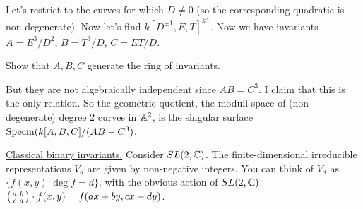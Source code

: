 Let's restrict to the curves for which $D\neq 0$ (so the corresponding quadratic is non-degenerate). Now let's find $k[D^{\pm 1},E,T]^{k^\times}$. Now we have invariants $A=E^3/D^2$, $B=T^3/D$, $C=ET/D$.
\begin{exercise}
 Show that $A,B,C$ generate the ring of invariants.
\end{exercise}
But they are not algebraically independent since $AB=C^3$. I claim that this is the only relation. So the geometric quotient, the moduli space of (non-degenerate) degree 2 curves in $\AA^2$, is the singular surface $\specm(k[A,B,C]/(AB-C^3)$.
 
\underline{Classical binary invariants.} Consider $SL(2,\CC)$. The finite-dimensional irreducible representations $V_d$ are given by non-negative integers. You can think of $V_d$ as $\{f(x,y)|\deg f=d\}$. with the obvious action of $SL(2,\CC)$: $\matx{a&b\\ c&d}\cdot f(x,y) = f(ax+by,cx+dy)$.


